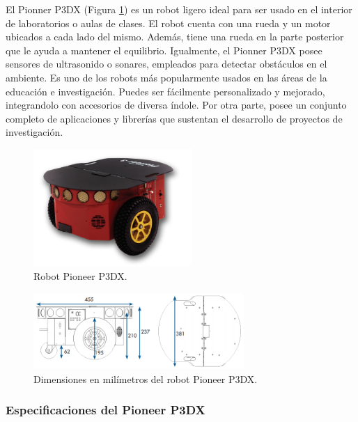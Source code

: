 \documentclass[11pt,twoside,A5]{article}
\newcommand{\reffigure}[1]{Figura \ref{#1}}
\newcommand{\refpfigure}[1]{(\reffigure{#1})}
\begin{document}
El Pionner P3DX \refpfigure{fig:pioneer} es un robot ligero ideal para ser usado en el interior de laboratorios o aulas de clases. El robot cuenta con una rueda y un motor ubicados a cada lado del mismo. Además, tiene una rueda en la parte posterior que le ayuda a mantener el equilibrio.
Igualmente, el Pionner P3DX posee sensores de ultrasonido o sonares, empleados para detectar obstáculos en el ambiente.
Es uno de los robots más popularmente usados en las áreas de la educación e investigación. Puedes ser fácilmente personalizado y mejorado, integrandolo con accesorios de diversa índole. Por otra parte, posee un conjunto completo de aplicaciones y librerías que sustentan el desarrollo de proyectos de investigación.

\begin{figure}[here]
	\centering
	\includegraphics[width=6cm]{pioneer.png} 
	\caption{Robot Pioneer P3DX.}
	\label{fig:pioneer}
\end{figure} 

\begin{figure}[here]
	\centering
	\includegraphics[width=8cm]{pioneer-dimensiones.png} 
	\caption{Dimensiones en milímetros del robot Pioneer P3DX.}
	\label{fig:pioneer-dimensiones}
\end{figure} 

\subsubsection*{Especificaciones del Pioneer P3DX}
\end{document}
